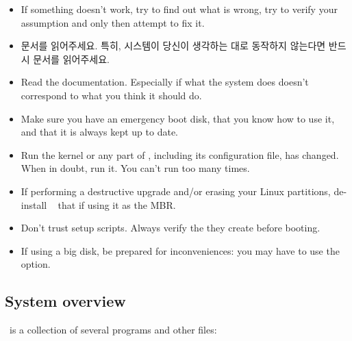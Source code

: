 \begin{itemize}
  \item {} If something doesn't work, try to find
    out what is wrong, try to verify your assumption and only then attempt
    to fix it.
  \item 문서를 읽어주세요. 특히, 시스템이 당신이 생각하는 대로 동작하지 않는다면 반드시 문서를 읽어주세요.    
  \item Read the documentation. Especially if what the system does doesn't
    correspond to what you think it should do.
  \item Make sure you have an emergency boot disk, that you know how to
    use it, and that it is always kept up to date.
  \item Run   the kernel or any part
    of \LILO, including its configuration file, has changed. When in doubt,
    run it. You can't run  too many times.
  \item If performing a destructive upgrade and/or erasing your Linux
    partitions, de-install \LILO\  that if using it as the
    MBR.
  \item Don't trust setup scripts. Always verify the 
    they create before booting.
  \item If using a big disk, be prepared for inconveniences: you may have
    to use the  option.
\end{itemize}


\newpage
\subsection*{System overview}

\LILO\ is a collection of several programs and other files:

